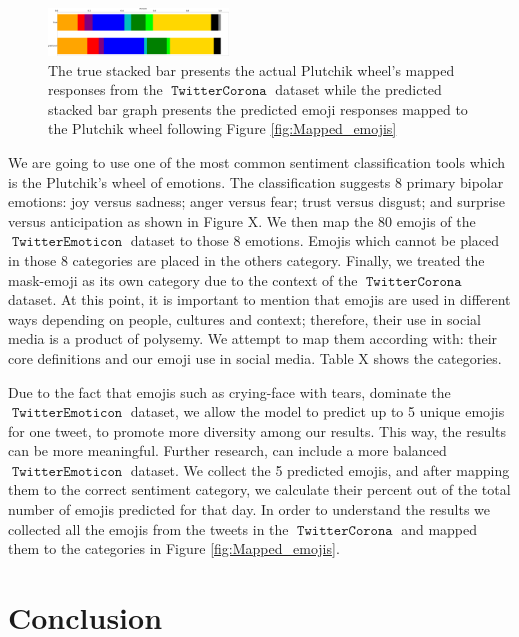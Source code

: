 \documentclass[11pt]{article}
\DeclareMathOperator{\emoticon}{\texttt{TwitterEmoticon}}
\DeclareMathOperator{\corona}{\texttt{TwitterCorona}}
\begin{document}
\begin{figure}
    \centering
    \includegraphics[width=\textwidth,height=0.5in]{images/true_pred_rotated.pdf}
    \caption{The true stacked bar presents the actual Plutchik wheel's mapped responses from the $\corona$ dataset while the predicted stacked bar graph presents the predicted emoji responses mapped to the Plutchik wheel following Figure  \ref{fig:Mapped_emojis} }
    \label{fig:actual vs pred}
\end{figure}

We are going to use one of the most common sentiment classification tools which is the Plutchik's wheel of emotions.
The classification \cite{} suggests 8 primary bipolar emotions: joy versus sadness; anger versus fear; trust versus disgust; 
and surprise versus anticipation as shown in Figure X. We then map the 80 emojis of the $\emoticon$ dataset
to those 8 emotions. Emojis which cannot be placed in those 8 categories are placed in the others category. 
Finally, we treated the mask-emoji as its own category due to the context of the $\corona$ dataset.
At this point, it is important to mention that emojis are used in different ways depending on people, cultures and context;
therefore, their use in social media is a product of polysemy. We attempt to map them according with: their core definitions and
our emoji use in social media. Table X shows the categories.  

Due to the fact that emojis such as crying-face with tears, dominate the $\emoticon$ dataset,
we allow the model to predict up to 5 unique emojis for one tweet, to promote more diversity among our results.
This way, the results can be more meaningful. Further research, can include a more balanced $\emoticon$ dataset.
We collect the 5 predicted emojis, and after mapping them to the correct sentiment category, we calculate their 
percent out of the total number of emojis predicted for that day. 
In order to understand the results we collected all the emojis from the tweets in the $\corona$ and mapped them to the categories in Figure \ref{fig:Mapped_emojis}.  

\section{Conclusion}

{ \color{blue} \lipsum[1-2] }
\end{document}
